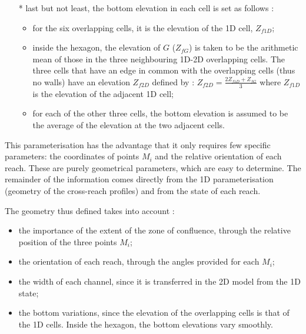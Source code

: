 \begin{itemize}
\begin{figure}[h]
\begin{center}
    \end{center}
  \end{figure}
  \vspace{0.5cm}
 \item[*] last but not least, the bottom elevation in each cell is set as follows :
   \begin{itemize}
     \item for the six overlapping cells, it is the elevation of the 1D cell, $Z_{f1D}$;
     \item inside the hexagon, the elevation of $G$ ($Z_{fG}$) is taken to be the arithmetic mean of those in the three neighbouring 1D-2D overlapping cells. The three cells that have an edge in common with the overlapping cells (thus no walls) have an elevation $Z_{f2D}$ defined by : $Z_{f2D} = \frac{2Z_{f1D}+Z_{fG}}{3}$ where $Z_{f1D}$ is the elevation of the adjacent 1D cell;
     \item for each of the other three cells, the bottom elevation is assumed to be the average of the elevation at the two adjacent cells.
   \end{itemize}
\end{itemize}

\vspace{0.5cm}

This parameterisation has the advantage that it only requires few specific parameters: the coordinates of points $M_i$ and the relative orientation of each reach. These are purely geometrical parameters, which are easy to determine. The remainder of the information comes directly from the 1D parameterisation (geometry of the cross-reach profiles) and from the state of each reach.

\vspace{0.5cm}

The geometry thus defined takes into account :

\begin{itemize}
 \item the importance of the extent of the zone of confluence, through the relative position of the three points $M_i$;
 \item the orientation of each reach, through the angles provided for each $M_i$;
 \item the width of each channel, since it is transferred in the 2D model from the 1D state;
 \item the bottom variations, since the elevation of the overlapping cells is that of the 1D cells. Inside the hexagon, the bottom elevations vary smoothly.
\end{itemize}

